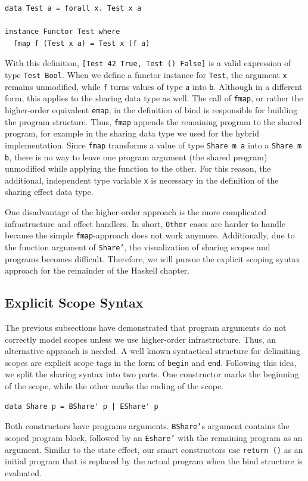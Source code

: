 \documentclass[a4paper, 11pt, fleqn, twoside, abstract=on]{scrreprt}
\newcommand{\hinl}[1]{\texttt{#1}}
\begin{document}
\begin{verbatim}
data Test a = forall x. Test x a

instance Functor Test where
  fmap f (Test x a) = Test x (f a)
\end{verbatim}
\noindent
With this definition, \hinl{[Test 42 True, Test () False]} is a valid expression of type \hinl{Test Bool}.
When we define a functor instance for \hinl{Test}, the argument \hinl{x} remains unmodified, while \hinl{f} turns values of type \hinl{a} into \hinl{b}.
Although in a different form, this applies to the sharing data type as well.
The call of \hinl{fmap}, or rather the higher-order equivalent \hinl{emap}, in the definition of bind is responsible for building the program structure.
Thus, \hinl{fmap} appends the remaining program to the shared program, for example in the sharing data type we used for the hybrid implementation.
Since \hinl{fmap} transforms a value of type \hinl{Share m a} into a \hinl{Share m b}, there is no way to leave one program argument (the shared program) unmodified while applying the function to the other.
For this reason, the additional, independent type variable \hinl{x} is necessary in the definition of the sharing effect data type.

One disadvantage of the higher-order approach is the more complicated infrastructure and effect handlers.
In short, \hinl{Other} cases are harder to handle because the simple \hinl{fmap}-approach does not work anymore.
Additionally, due to the function argument of \hinl{Share'}, the visualization of sharing scopes and programs becomes difficult.
Therefore, we will pursue the explicit scoping syntax approach for the remainder of the Haskell chapter.

\subsection{Explicit Scope Syntax}
\label{subsec:explicit}
The previous subsections have demonstrated that program arguments do not correctly model scopes unless we use higher-order infrastructure.
Thus, an alternative approach is needed.
A well known syntactical structure for delimiting scopes are explicit scope tags in the form of \hinl{begin} and \hinl{end}.
Following this idea, we split the sharing syntax into two parts.
One constructor marks the beginning of the scope, while the other marks the ending of the scope.

\begin{verbatim}
data Share p = BShare' p | EShare' p
\end{verbatim}
\noindent
Both constructors have programs arguments.
\hinl{BShare'}s argument contains the scoped program block, followed by an \hinl{Eshare'} with the remaining program as an argument.
Similar to the state effect, our smart constructors use \hinl{return ()} as an initial program that is replaced by the actual program when the bind structure is evaluated.
\end{document}
